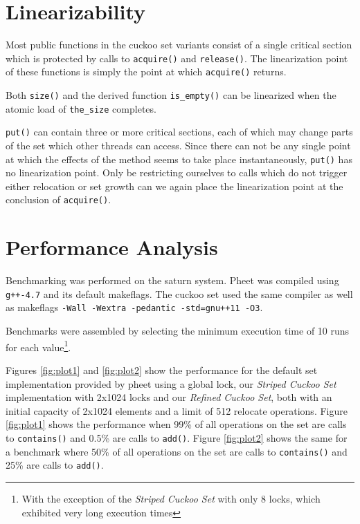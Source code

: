 \documentclass[a4paper,10pt]{article}
\begin{document}
\section{Linearizability}
\label{sec:linearizability}

Most public functions in the cuckoo set variants consist of a single critical
section which is protected by calls to \lstinline|acquire()| and
\lstinline|release()|.  The linearization point of these functions is simply
the point at which \lstinline|acquire()| returns.

Both \lstinline|size()| and the derived function \lstinline|is_empty()| can be
linearized when the atomic load of \lstinline|the_size| completes.

\lstinline|put()| can contain three or more critical sections, each of which
may change parts of the set which other threads can access. Since there can not
be any single point at which the effects of the method seems to take place
instantaneously, \lstinline|put()| has no linearization point. Only be
restricting ourselves to calls which do not trigger either relocation or set
growth can we again place the linearization point at the conclusion of
\lstinline|acquire()|.

\section{Performance Analysis}
\label{sec:performance}

Benchmarking was performed on the saturn system. Pheet was compiled using
\verb|g++-4.7| and its default makeflags. The cuckoo set used the same
compiler as well as makeflags \verb|-Wall -Wextra -pedantic -std=gnu++11 -O3|.

Benchmarks were assembled by selecting the minimum execution time of 10 runs
for each value\footnote{With the exception of the \emph{Striped
Cuckoo Set} with only 8 locks, which exhibited very long execution times}.

Figures \ref{fig:plot1} and \ref{fig:plot2} show the performance for the
default set implementation provided by pheet using a global lock, our
\emph{Striped Cuckoo Set} implementation with 2x1024 locks and our
\emph{Refined Cuckoo Set}, both with an initial capacity of 2x1024 elements
and a limit of 512 relocate operations.  Figure \ref{fig:plot1} shows the
performance when 99\% of all operations on the set are calls to
\lstinline|contains()| and 0.5\% are calls to \lstinline|add()|. Figure
\ref{fig:plot2} shows the same for a benchmark where 50\% of all operations on
the set are calls to \lstinline|contains()| and 25\% are calls to
\lstinline|add()|.
\end{document}

